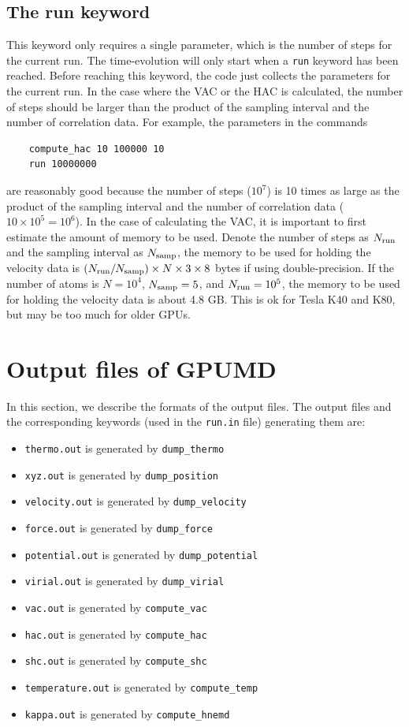 \documentclass[12pt,a4paper]{report}
\begin{document}
\subsection{The run keyword}

This keyword only requires a single parameter, which is the number of steps for the current run. The time-evolution will only start when a \verb"run" keyword has been reached. Before reaching this keyword, the code just collects the parameters for the current run. In the case where the VAC or the HAC is calculated, the number of steps should be larger than the product of the sampling interval and the number of correlation data. For example, the parameters in the commands
\begin{verbatim}
    compute_hac 10 100000 10
    run 10000000
\end{verbatim}
are reasonably good because the number of steps ($10^7$) is 10 times as large as the product of the sampling interval and the number of correlation data ($10\times 10^5=10^6$). In the case of calculating the VAC, it is important to first estimate the amount of memory to be used. Denote the number of steps as $N_{\textmd{run}}$ and the sampling interval as $N_{\textmd{samp}}$, the memory to be used for holding the velocity data is $(N_{\textmd{run}}/N_{\textmd{samp}})\times N \times 3 \times 8$ bytes if using double-precision. If the number of atoms is $N=10^4$, $N_{\textmd{samp}}=5$, and $N_{\textmd{run}}=10^5$, the memory to be used for holding the velocity data is about 4.8 GB. This is ok for Tesla K40 and K80, but may be too much for older GPUs.




\section{Output files of GPUMD}

In this section, we describe the formats of the output files. The output files and the corresponding keywords (used in the \verb"run.in" file) generating them are:
\begin{itemize}
\item \verb"thermo.out" is generated by \verb"dump_thermo"
\item \verb"xyz.out" is generated by \verb"dump_position"
\item \verb"velocity.out" is generated by \verb"dump_velocity"
\item \verb"force.out" is generated by \verb"dump_force"
\item \verb"potential.out" is generated by \verb"dump_potential"
\item \verb"virial.out" is generated by \verb"dump_virial"
\item \verb"vac.out" is generated by \verb"compute_vac"
\item \verb"hac.out" is generated by \verb"compute_hac"
\item \verb"shc.out" is generated by \verb"compute_shc"
\item \verb"temperature.out" is generated by \verb"compute_temp"
\item \verb"kappa.out" is generated by \verb"compute_hnemd"
\end{itemize}
\end{document}
